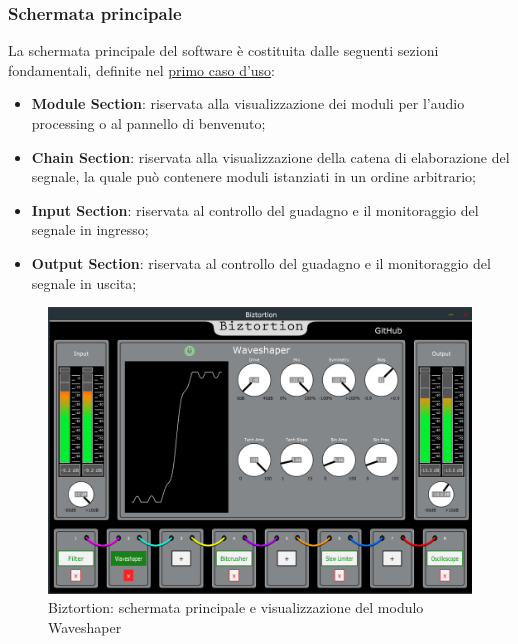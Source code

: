 \subsubsection*{Schermata principale}
La schermata principale del software è costituita dalle seguenti sezioni fondamentali, definite nel \hyperref[uc:1]{primo caso d'uso}:
\begin{itemize}
    \item \textbf{Module Section}: riservata alla visualizzazione dei moduli per l’audio processing o al pannello di benvenuto;
    \item \textbf{Chain Section}: riservata alla visualizzazione della catena di elaborazione del segnale, la quale può contenere moduli istanziati in un ordine arbitrario;
    \item \textbf{Input Section}: riservata al controllo del guadagno e il monitoraggio del segnale in ingresso;
    \item \textbf{Output Section}: riservata al controllo del guadagno e il monitoraggio del segnale in uscita;
\end{itemize}
\begin{figure}[h!] 
    \centering 
    \includegraphics[width=0.9\columnwidth]{immagini/cap3/main.png}
    \caption{Biztortion: schermata principale e visualizzazione del modulo Waveshaper}
\end{figure}


